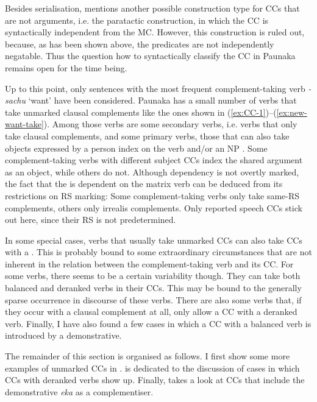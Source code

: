 
Besides serialisation, \citet[87]{Noonan2007} mentions another possible construction type for CCs that are not arguments, i.e. the paratactic construction, in which the CC is syntactically independent from the MC. However, this construction is ruled out, because, as has been shown above, the predicates are not independently negatable. Thus the question how to syntactically classify the CC in Paunaka remains open for the time being.

Up to this point, only sentences with the most frequent complement-taking verb \textit{-sachu} ‘want’ have been considered. Paunaka has a small number of verbs that take unmarked clausal complements like the ones shown in (\ref{ex:CC-1})–(\ref{ex:new-want-take}). Among those verbs are some secondary verbs, i.e. verbs that only take clausal complements, and some primary verbs, those that can also take objects expressed by a person index on the verb and/or an NP \citep[cf.][9]{Dixon2006}. Some complement-taking verbs with different subject CCs index the shared argument as an object, while others do not. Although dependency is not overtly marked, the fact that the  is dependent on the matrix verb can be deduced from its restrictions on RS marking: Some complement-taking verbs only take same-RS complements, others only irrealis complements. Only reported speech CCs stick out here, since their RS is not predetermined. 

In some special cases, verbs that usually take unmarked CCs can also take CCs with a . This is probably bound to some extraordinary circumstances that are not inherent in the relation between the complement-taking verb and its CC. For some verbs, there seems to be a certain variability though. They can take both balanced and deranked verbs in their CCs. This may be bound to the generally sparse occurrence in discourse of these verbs. There are also some verbs that, if they occur with a clausal complement at all, only allow a CC with a deranked verb. Finally, I have also found a few cases in which a CC with a balanced verb is introduced by a demonstrative.

The remainder of this section is organised as follows. I first show some more examples of unmarked CCs in .  is dedicated to the discussion of cases in which CCs with deranked verbs show up. Finally,  takes a look at CCs that include the demonstrative \textit{eka} as a complementiser.

